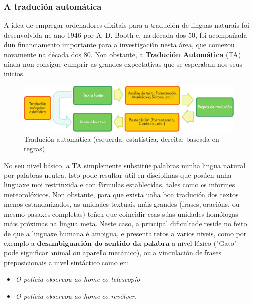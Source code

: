 \begin{multicols}{2}
\subsubsection{A tradución automática}

  A idea de empregar ordenadores dixitais para a tradución de linguas naturais foi desenvolvida no ano 1946 por A. D. Booth e, na década dos 50, foi acompañada dun financiamento importante para a investigación nesta área, que comezou novamente na década dos 80. Non obstante, a \textbf{Tradución Automática} (TA) aínda non consigue cumprir as grandes expectativas que se esperaban nos seus inicios. 


\begin{figure}[htb]
  \center
  \includegraphics[width=\textwidth]{../_media/galician/machine_translation}
  \caption{Tradución automática (esquerda: estatística, dereita: baseada en regras)}
  \label{fig:mtarch_ga}
\end{figure}

No seu nivel básico, a TA simplemente substitúe palabras nunha lingua natural por palabras noutra. Isto pode resultar útil en disciplinas que posúen unha linguaxe moi restrinxida e con fórmulas establecidas, tales como os informes meteorolóxicos. Non obstante, para que exista unha boa tradución dos textos menos estandarizados, as unidades textuais máis grandes (frases, oracións, ou mesmo pasaxes completas) teñen que coincidir coas súas unidades homólogas máis próximas na lingua meta. Neste caso, a principal dificultade reside no feito de que a linguaxe humana é ambigua, e presenta retos a varios niveis, como por exemplo a \textbf{desambiguación do sentido da palabra} a nivel léxico ("Gato" pode significar animal ou aparello mecánico), ou a vinculación de frases preposicionais a nivel sintáctico como en:

\begin{itemize}
\item[] \textit{O policía observou ao home co telescopio}
\item[]\textit{O policía observou ao home co revólver.}
\end{itemize}


\end{multicols}
